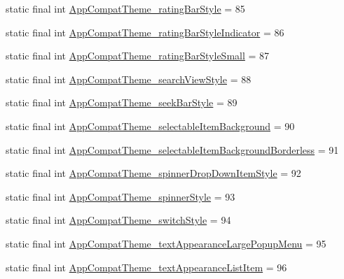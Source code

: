 \begin{DoxyCompactItemize}
\item 
static final int \mbox{\hyperlink{classcom_1_1synnapps_1_1carouselview_1_1_r_1_1styleable_aa4ce4690b7ddea271dbe7fb54e6d2ae1}{App\+Compat\+Theme\+\_\+rating\+Bar\+Style}} = 85
\item 
static final int \mbox{\hyperlink{classcom_1_1synnapps_1_1carouselview_1_1_r_1_1styleable_a92bc20cd996eaba4f4fd941bb9d66cb1}{App\+Compat\+Theme\+\_\+rating\+Bar\+Style\+Indicator}} = 86
\item 
static final int \mbox{\hyperlink{classcom_1_1synnapps_1_1carouselview_1_1_r_1_1styleable_a2d4930d16b073a8610fd36187d4d182b}{App\+Compat\+Theme\+\_\+rating\+Bar\+Style\+Small}} = 87
\item 
static final int \mbox{\hyperlink{classcom_1_1synnapps_1_1carouselview_1_1_r_1_1styleable_a52288543a9872bd1fb8b403d35bbf018}{App\+Compat\+Theme\+\_\+search\+View\+Style}} = 88
\item 
static final int \mbox{\hyperlink{classcom_1_1synnapps_1_1carouselview_1_1_r_1_1styleable_a8450fb6a733fbbbb0d30c2b50c60a6c6}{App\+Compat\+Theme\+\_\+seek\+Bar\+Style}} = 89
\item 
static final int \mbox{\hyperlink{classcom_1_1synnapps_1_1carouselview_1_1_r_1_1styleable_a67428d6985b9aacf8e916e6e6fa6bcce}{App\+Compat\+Theme\+\_\+selectable\+Item\+Background}} = 90
\item 
static final int \mbox{\hyperlink{classcom_1_1synnapps_1_1carouselview_1_1_r_1_1styleable_a4890d7e063c1f9d1b9ae01f92d9c0443}{App\+Compat\+Theme\+\_\+selectable\+Item\+Background\+Borderless}} = 91
\item 
static final int \mbox{\hyperlink{classcom_1_1synnapps_1_1carouselview_1_1_r_1_1styleable_a5de9b61fca00458eb143afeb1bd01f33}{App\+Compat\+Theme\+\_\+spinner\+Drop\+Down\+Item\+Style}} = 92
\item 
static final int \mbox{\hyperlink{classcom_1_1synnapps_1_1carouselview_1_1_r_1_1styleable_a2712b93bdb685347984360da68c61a06}{App\+Compat\+Theme\+\_\+spinner\+Style}} = 93
\item 
static final int \mbox{\hyperlink{classcom_1_1synnapps_1_1carouselview_1_1_r_1_1styleable_a4f6c64f795fa4d8762e4dbe43d7d585e}{App\+Compat\+Theme\+\_\+switch\+Style}} = 94
\item 
static final int \mbox{\hyperlink{classcom_1_1synnapps_1_1carouselview_1_1_r_1_1styleable_a9940ae2242e33df95e07f829875db4ca}{App\+Compat\+Theme\+\_\+text\+Appearance\+Large\+Popup\+Menu}} = 95
\item 
static final int \mbox{\hyperlink{classcom_1_1synnapps_1_1carouselview_1_1_r_1_1styleable_a5b1e811734a976c61699211f4e221a13}{App\+Compat\+Theme\+\_\+text\+Appearance\+List\+Item}} = 96

\end{DoxyCompactItemize}
